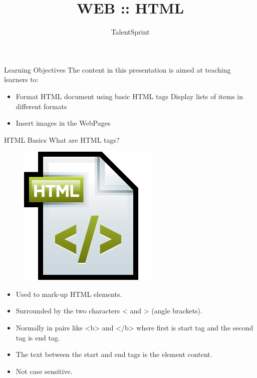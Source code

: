 \documentclass[14pt]{beamer}
\title[WEB:HTML:01]{WEB :: HTML}
\author[TS]{TalentSprint}
\institute[L\&D]{Licensed To Skill}
\begin{document}
\begin{frame}
  \titlepage
\end{frame}

\begin{frame}{Learning Objectives}
The content in this presentation is aimed at teaching  learners to:
  \begin{itemize}
  \item Format HTML document using basic HTML tags Display lists of items in different formats
  \item Insert images in the WebPages
  \end{itemize}
\end{frame}

\begin{frame}{HTML Basics}
 What are HTML tags?
 
 \begin{minipage}{1cm}
  \begin{figure}[H]
   \begin{center}
    \includegraphics[scale=.2]{html-tags.png}
   \end{center}
  \end{figure}
 \end{minipage}
 \quad
 \begin{minipage}{8cm}
 \small
  \begin{itemize}
   \item Used to mark-up HTML elements. 
   \item Surrounded by the two characters < and > (angle brackets).
   \item Normally in pairs like <b> and </b> where first is start tag and the second tag is end tag. 
   \item The text between the start and end tags is the element content.
   \item Not case sensitive.
  \end{itemize}
 \end{minipage}
\end{frame}
\end{document}
